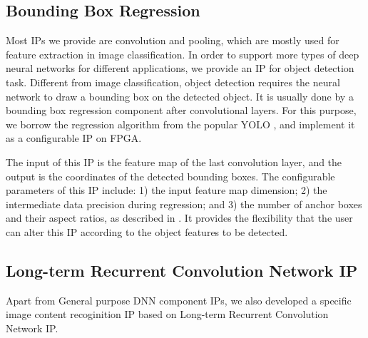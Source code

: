 \documentclass[a4paper, 11pt]{article}
\begin{document}
\subsection{Bounding Box Regression}

Most IPs we provide are convolution and pooling, which are mostly used for feature extraction in image classification.
In order to support more types of deep neural networks for different applications, we provide an IP for object detection task.
Different from image classification, object detection requires the neural network to draw a bounding box on the detected object.
It is usually done by a bounding box regression component after convolutional layers. For this purpose, we borrow the regression algorithm from the popular YOLO \cite{r7}, and implement it as a configurable IP on FPGA.



The input of this IP is the feature map of the last convolution layer, and the output is the coordinates of the detected bounding boxes.
The configurable parameters of this IP include:
1) the input feature map dimension; 2) the intermediate data precision during regression; and 3) the number of anchor boxes and their aspect ratios, as described in \cite{r7}.
It provides the flexibility that the user can alter this IP according to the object features to be detected.


\subsection{Long-term Recurrent Convolution Network IP}

Apart from General purpose DNN component IPs, we also developed a specific image content recoginition IP based on Long-term Recurrent Convolution Network IP. 
\end{document}
